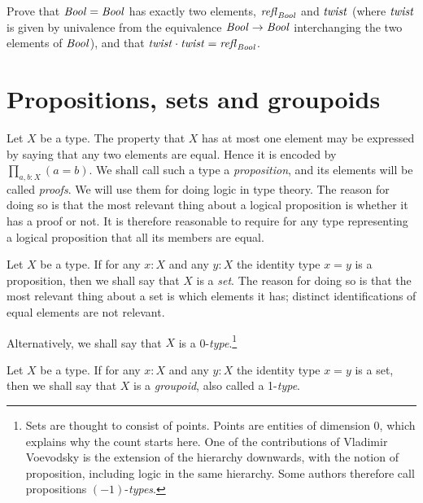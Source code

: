 \begin{xca}\label{xca:C2}
Prove that $\mathop{\mathit{Bool}}=\mathop{\mathit{Bool}}$ has exactly two elements, 
$\mathop{{\it refl}_{\mathop{\mathit{Bool}}}}$ and $\mathit{twist}$ (where $\mathit{twist}$ is given by 
univalence from the equivalence $\mathop{\mathit{Bool}}\to\mathop{\mathit{Bool}}$ interchanging 
the two elements of $\mathop{\mathit{Bool}}$), and that $\mathit{twist}\cdot\mathit{twist}=\mathop{{\it refl}_{\mathop{\mathit{Bool}}}}$.
\end{xca}


\section{Propositions, sets and groupoids}
\label{sec:props-sets-grpds}

Let $X$ be a type.  The property that $X$ has at most one element may 
be expressed by saying that any two elements are equal. 
Hence it is encoded by $\prod_{a,b:X} (a=b)$.  
We shall call such a type a \emph{proposition}, 
and its elements will be called \emph{proofs}.
We will use them for doing logic in type theory.
The reason for doing so is that the most relevant
thing about a logical proposition is whether it has a proof or not.
It is therefore reasonable to require for any type representing 
a logical proposition that all its members are equal.

Let $X$ be a type.  If for any $x:X$ and any $y:X$ the identity 
type $x=y$ is a proposition, then we shall say that $X$ is a \emph{set}.
The reason for doing so is that the most relevant
thing about a set is which elements it has; distinct identifications
of equal elements are not relevant.

Alternatively, we shall say that $X$ is a 0-\emph{type}.\footnote{%
Sets are thought to consist of points. Points are entities of dimension 0, 
which explains why the count starts here.
One of the contributions of Vladimir Voevodsky is the extension of
the hierarchy downwards, with the notion of proposition,
including logic in the same hierarchy.
Some authors therefore call propositions $(-1)$-\emph{types}.} 

Let $X$ be a type.  If for any $x:X$ and any $y:X$ the identity type $x=y$ is a set, 
 then we shall say that $X$ is a \emph{groupoid}, also called a 1-\emph{type}.


